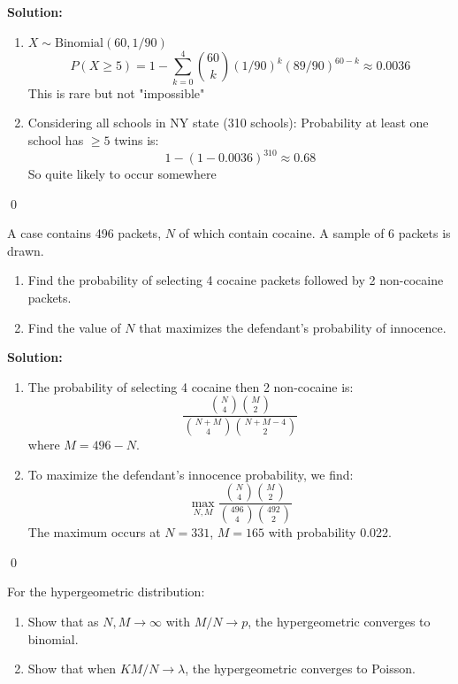 \noindent\textbf{Solution:}
\begin{enumerate}[label=(\alph*)]
\item \( X \sim \text{Binomial}(60, 1/90) \)
\[ P(X \geq 5) = 1 - \sum_{k=0}^4 \binom{60}{k} (1/90)^k (89/90)^{60-k} \approx 0.0036 \]
This is rare but not "impossible"

\item Considering all schools in NY state (310 schools):
Probability at least one school has \( \geq 5 \) twins is:
\[ 1 - (1 - 0.0036)^{310} \approx 0.68 \]
So quite likely to occur somewhere
\end{enumerate}


\qed
\begin{problembox}
A case contains 496 packets, \( N \) of which contain cocaine. A sample of 6 packets is drawn.
\begin{enumerate}[label=(\alph*)]
\item Find the probability of selecting 4 cocaine packets followed by 2 non-cocaine packets.
\item Find the value of \( N \) that maximizes the defendant's probability of innocence.
\end{enumerate}
\end{problembox}

\noindent\textbf{Solution:}
\begin{enumerate}[label=(\alph*)]
\item The probability of selecting 4 cocaine then 2 non-cocaine is:
\[
\frac{\binom{N}{4}\binom{M}{2}}{\binom{N+M}{4}\binom{N+M-4}{2}}
\]
where \( M = 496 - N \).

\item To maximize the defendant's innocence probability, we find:
\[
\max_{N,M} \frac{\binom{N}{4}\binom{M}{2}}{\binom{496}{4}\binom{492}{2}}
\]
The maximum occurs at \( N = 331 \), \( M = 165 \) with probability 0.022.
\end{enumerate}


\qed
\begin{problembox}
For the hypergeometric distribution:
\begin{enumerate}[label=(\alph*)]
\item Show that as \( N,M \to \infty \) with \( M/N \to p \), the hypergeometric converges to binomial.
\item Show that when \( KM/N \to \lambda \), the hypergeometric converges to Poisson.
\end{enumerate}
\end{problembox}

